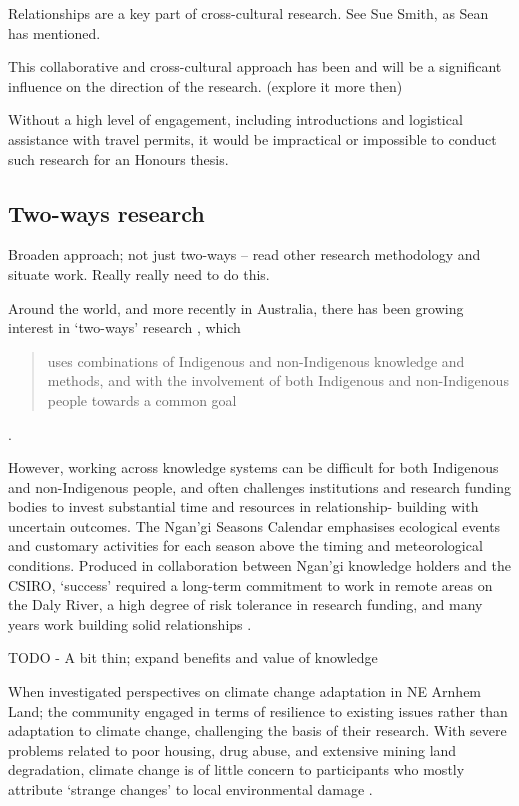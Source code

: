 Relationships are a key part of cross-cultural research.  See Sue Smith, as 
Sean has mentioned.

This collaborative and cross-cultural approach has been and will be a 
significant influence on the direction of the research. (explore it more then)

Without a high level of engagement, including introductions and logistical
assistance with travel permits, it would be impractical or impossible to conduct
such research for an Honours thesis.


\subsection{Two-ways research}
Broaden approach; not just two-ways – read other research methodology and 
situate work.  Really really need to do this.

Around the world, and more recently in Australia, there has been growing 
interest in `two-ways' research \citep{turner2009,prober2011}, 
which \blockquote{uses combinations of Indigenous and non-Indigenous knowledge and 
methods, and with the involvement of both Indigenous and non-Indigenous people 
towards a common goal} \citep{ens2014}.  

However, working across knowledge systems can be difficult for both Indigenous 
and non-Indigenous people, and often challenges institutions and research 
funding bodies to invest substantial time and resources in relationship-
building with uncertain outcomes.  The Ngan'gi Seasons Calendar emphasises 
ecological events and customary activities for each season above the timing and 
meteorological conditions.  Produced in collaboration between Ngan'gi knowledge 
holders and the CSIRO, `success' required a long-term commitment to work in 
remote areas on the Daly River, a high degree of risk tolerance in 
research funding, and many years work building solid relationships \citep{woodward2010}.

TODO - A bit thin; expand benefits and value of knowledge

When \citet{petheram2010} investigated perspectives on climate change 
adaptation in NE Arnhem Land; the community engaged in terms of resilience to 
existing issues rather than adaptation to climate change, challenging the basis 
of their research.  With severe problems related to poor housing, drug abuse, 
and extensive mining land degradation, climate change is of little concern to 
participants who mostly attribute `strange changes' to local environmental 
damage \citep{green2010a}.



